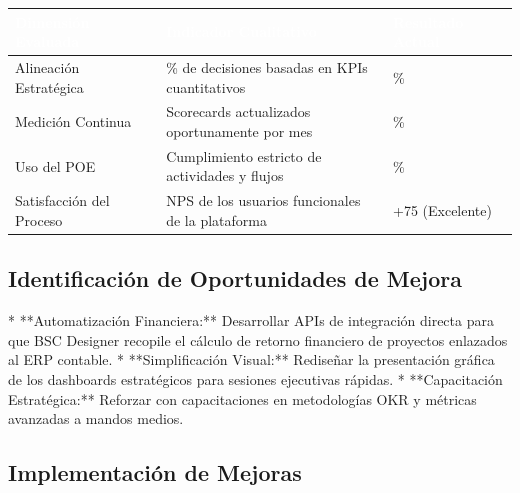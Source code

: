 \documentclass[11pt]{article}
\newcounter{none} %
\begin{document}
\vspace{0.3cm}
\setlength{\tabcolsep}{5pt}
\renewcommand{\arraystretch}{1.5}
{\def\LTcaptype{none}
\begin{longtable}[]{@{}
  >{\raggedright\arraybackslash}p{0.30\linewidth}
  >{\raggedright\arraybackslash}p{0.45\linewidth}
  >{\centering\arraybackslash}p{0.25\linewidth}@{}}
\rowcolor{DeepNavy}
\textcolor{white}{\textbf{Dimensión Evaluada}} & \textcolor{white}{\textbf{Indicador Cualitativo}} & \textcolor{white}{\textbf{Resultado Actual}} \\ \hline
\endhead
\rowcolor{LightGray}
Alineación Estratégica & \% de decisiones basadas en KPIs cuantitativos & 95\% \\ \hline
Medición Continua & Scorecards actualizados oportunamente por mes & 100\% \\ \hline
\rowcolor{LightGray}
Uso del POE & Cumplimiento estricto de actividades y flujos & 90\% \\ \hline
Satisfacción del Proceso & NPS de los usuarios funcionales de la plataforma & +75 (Excelente) \\ \hline
\end{longtable}
}

\subsection{Identificación de Oportunidades de Mejora}
* **Automatización Financiera:** Desarrollar APIs de integración directa para que BSC Designer recopile el cálculo de retorno financiero de proyectos enlazados al ERP contable.
* **Simplificación Visual:** Rediseñar la presentación gráfica de los dashboards estratégicos para sesiones ejecutivas rápidas.
* **Capacitación Estratégica:** Reforzar con capacitaciones en metodologías OKR y métricas avanzadas a mandos medios.

\subsection{Implementación de Mejoras}
\end{document}
